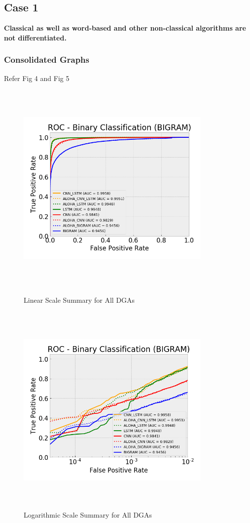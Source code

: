 \documentclass[conference]{IEEEtran}
\begin{document}
\subsection{Case 1}
\textbf{Classical as well as word-based and other non-classical algorithms are not differentiated.}
\subsubsection{Consolidated Graphs}
Refer Fig 4 and Fig 5 \\
\begin{figure}[!h]
\centerline{\includegraphics[width=9.5cm,height=10.5cm,keepaspectratio]{linear_scale_all_dga.png}}
\caption{Linear Scale Summary for All DGAs }
\label{fig}

\centerline{\includegraphics[width=9.5cm,height=10.5cm,keepaspectratio]{log_scale_all_dga.png}}
\caption{Logarithmic Scale Summary for All DGAs }
\label{fig}
\end{figure}
\end{document}
